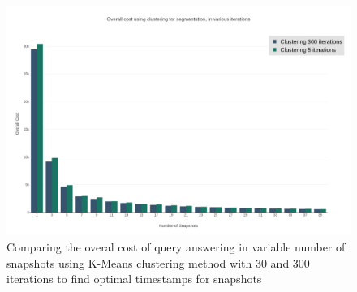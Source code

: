 			\begin{figure}
				\centering
				\includegraphics[width=\textwidth]{figs/compare_clustering_iterations.png}
				\caption{Comparing the overal cost of query answering in variable number of snapshots using K-Means clustering method with 30 and 300 iterations to find optimal timestamps for snapshots}
				\label{fig:compare_clusterings_iterations}
			\end{figure} 

